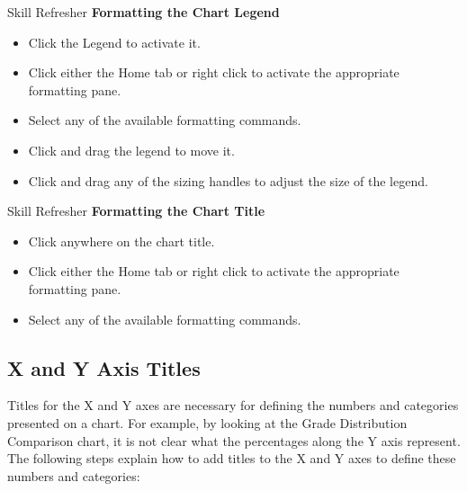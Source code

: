 \begin{center}
	\begin{sklbox}{Skill Refresher}
		\textbf{Formatting the Chart Legend}
		\\
		\begin{itemize}
			\setlength{\itemsep}{0pt}
			\setlength{\parskip}{0pt}
			\setlength{\parsep}{0pt}

			\item Click the Legend to activate it.
			\item Click either the Home tab or right click to activate the appropriate formatting pane.
			\item Select any of the available formatting commands.
			\item Click and drag the legend to move it.
			\item Click and drag any of the sizing handles to adjust the size of the legend.
			
		\end{itemize}
	\end{sklbox}
\end{center}

\begin{center}
	\begin{sklbox}{Skill Refresher}
		\textbf{Formatting the Chart Title}
		\\
		\begin{itemize}
			\setlength{\itemsep}{0pt}
			\setlength{\parskip}{0pt}
			\setlength{\parsep}{0pt}

			\item Click anywhere on the chart title.
			\item Click either the Home tab or right click to activate the appropriate formatting pane.
			\item Select any of the available formatting commands.
			
		\end{itemize}
	\end{sklbox}
\end{center}

\subsection{X and Y Axis Titles}

Titles for the X and Y axes are necessary for defining the numbers and categories presented on a
chart. For example, by looking at the Grade Distribution Comparison chart, it is not clear what the
percentages along the Y axis represent. The following steps explain how to add titles to the X and Y
axes to define these numbers and categories:

